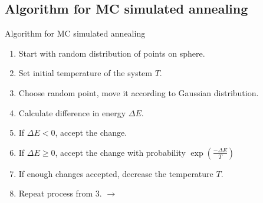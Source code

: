 \documentclass{beamer}
\begin{document}
\subsection{Algorithm for MC simulated annealing}
\begin{frame}{Algorithm for MC simulated annealing}
\begin{enumerate}
	\item {Start with random distribution of points on sphere.}
	\item {Set initial temperature of the system $T$.}
	\item {Choose random point, move it according to Gaussian distribution.}
	\item {Calculate difference in energy $\Delta E$.}
	\item {If $\Delta E < 0$, accept the change.} 
	\item {If $\Delta E \geq 0$, accept the change with probability $\exp(\frac{-\Delta E}{T})$}
	\item {If enough changes accepted, decrease the temperature $T$.}
	\item {Repeat process from 3. $\longrightarrow$}
\end{enumerate}
\end{frame}
\end{document}

